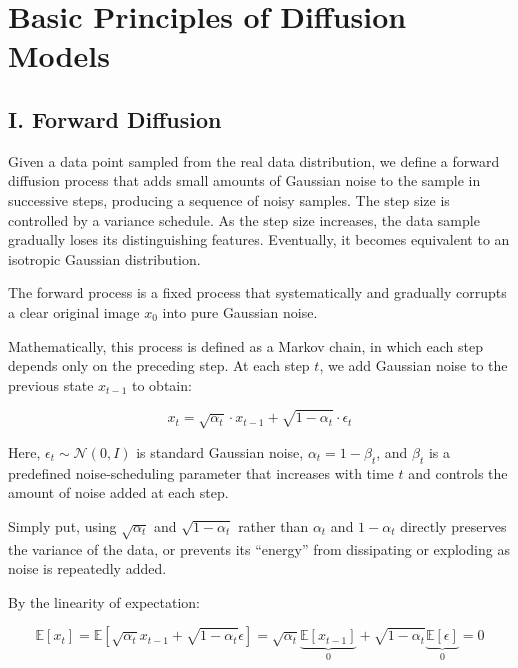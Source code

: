 \setcounter{section}{0}

\hypertarget{basic-principles-of-diffusion-models}{%
\section{Basic Principles of Diffusion Models}\label{basic-principles-of-diffusion-models}}

\hypertarget{i.-forward-diffusion}{%
\subsection{I. Forward Diffusion}\label{i.-forward-diffusion}}

Given a data point sampled from the real data distribution, we define a forward diffusion process that adds small amounts of Gaussian noise to the sample in successive steps, producing a sequence of noisy samples. The step size is controlled by a variance schedule. As the step size increases, the data sample gradually loses its distinguishing features. Eventually, it becomes equivalent to an isotropic Gaussian distribution.

The forward process is a fixed process that systematically and gradually corrupts a clear original image \(x_0\) into pure Gaussian noise.

Mathematically, this process is defined as a Markov chain, in which each step depends only on the preceding step. At each step \(t\), we add Gaussian noise to the previous state \(x_{t-1}\) to obtain:

\[
x_t = \sqrt{\alpha_t}\cdot x_{t-1} + \sqrt{1-\alpha_t}\cdot \epsilon_t
\]

Here, \(\epsilon_t \sim \mathcal{N}(0, I)\) is standard Gaussian noise, \(\alpha_t = 1-\beta_t\), and \(\beta_t\) is a predefined noise-scheduling parameter that increases with time \(t\) and controls the amount of noise added at each step.

Simply put, using \(\sqrt{\alpha_t}\) and \(\sqrt{1-\alpha_t}\) rather than \(\alpha_t\) and \(1-\alpha_t\) directly preserves the variance of the data, or prevents its ``energy'' from dissipating or exploding as noise is repeatedly added.

By the linearity of expectation:

\[
\mathbb{E}[x_t]
= \mathbb{E}\left[\sqrt{\alpha_t}x_{t-1}+\sqrt{1-\alpha_t}\epsilon\right]
= \sqrt{\alpha_t}\underbrace{\mathbb{E}[x_{t-1}]}_{0}
+ \sqrt{1-\alpha_t}\underbrace{\mathbb{E}[\epsilon]}_{0}
= 0
\]

